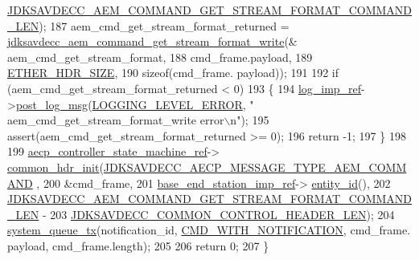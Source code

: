 \begin{DoxyCode}
      \hyperlink{group__command__get__stream__format_ga46b2baee8ffa91aaab7a630e72775f46}{JDKSAVDECC\_AEM\_COMMAND\_GET\_STREAM\_FORMAT\_COMMAND\_LEN});
187     aem\_cmd\_get\_stream\_format\_returned = 
      \hyperlink{group__command__get__stream__format_ga9195ddf9def8d3d66d0d516ed78df680}{jdksavdecc\_aem\_command\_get\_stream\_format\_write}(&
      aem\_cmd\_get\_stream\_format,
188                                                                                         cmd\_frame.payload,
189                                                                                         
      \hyperlink{namespaceavdecc__lib_a6c827b1a0d973e18119c5e3da518e65ca9512ad9b34302ba7048d88197e0a2dc0}{ETHER\_HDR\_SIZE},
190                                                                                         \textcolor{keyword}{sizeof}(cmd\_frame.
      payload));
191 
192     \textcolor{keywordflow}{if} (aem\_cmd\_get\_stream\_format\_returned < 0)
193     \{
194         \hyperlink{namespaceavdecc__lib_acbe3e2a96ae6524943ca532c87a28529}{log\_imp\_ref}->\hyperlink{classavdecc__lib_1_1log_a68139a6297697e4ccebf36ccfd02e44a}{post\_log\_msg}(\hyperlink{namespaceavdecc__lib_a501055c431e6872ef46f252ad13f85cdaf2c4481208273451a6f5c7bb9770ec8a}{LOGGING\_LEVEL\_ERROR}, \textcolor{stringliteral}{"
      aem\_cmd\_get\_stream\_format\_write error\(\backslash\)n"});
195         assert(aem\_cmd\_get\_stream\_format\_returned >= 0);
196         \textcolor{keywordflow}{return} -1;
197     \}
198 
199     \hyperlink{namespaceavdecc__lib_a0b1b5aea3c0490f77cbfd9178af5be22}{aecp\_controller\_state\_machine\_ref}->
      \hyperlink{classavdecc__lib_1_1aecp__controller__state__machine_aafc737d7ed17a62fed9df6528f18d3ec}{common\_hdr\_init}(\hyperlink{group__aecp__message__type_ga4625ce189cc209f42deb0629f48faf69}{JDKSAVDECC\_AECP\_MESSAGE\_TYPE\_AEM\_COMMAND}
      ,
200                                                        &cmd\_frame,
201                                                        \hyperlink{classavdecc__lib_1_1descriptor__base__imp_a550c969411f5f3b69f55cc139763d224}{base\_end\_station\_imp\_ref}->
      \hyperlink{classavdecc__lib_1_1end__station__imp_a363b6c9664a0d701def9b17863e20ad3}{entity\_id}(),
202                                                        
      \hyperlink{group__command__get__stream__format_ga46b2baee8ffa91aaab7a630e72775f46}{JDKSAVDECC\_AEM\_COMMAND\_GET\_STREAM\_FORMAT\_COMMAND\_LEN} -
203                                                            
      \hyperlink{group__jdksavdecc__avtp__common__control__header_gaae84052886fb1bb42f3bc5f85b741dff}{JDKSAVDECC\_COMMON\_CONTROL\_HEADER\_LEN});
204     \hyperlink{namespaceavdecc__lib_a6dd511685627c0865a3442b539a4e8e9}{system\_queue\_tx}(notification\_id, \hyperlink{namespaceavdecc__lib_aabcadff06aa62be0ce47bc0646823604aba48b8a017e06fb240b650cdea965178}{CMD\_WITH\_NOTIFICATION}, cmd\_frame.
      payload, cmd\_frame.length);
205 
206     \textcolor{keywordflow}{return} 0;
207 \}
\end{DoxyCode}


